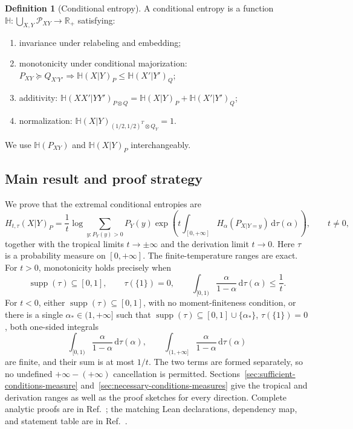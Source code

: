 \documentclass[aps,pra,11pt,onecolumn,nofootinbib,tightenlines]{revtex4-2}
\theoremstyle{definition}
\newtheorem{definition}[theorem]{Definition}
\def \d {\mathrm{d}}
\renewcommand{\H}{\mathbb{H}}
\newcommand{\R}{\mathbb{R}}
\newcommand{\mc}[1]{\mathcal{#1}}
\begin{document}
\begin{definition}[Conditional entropy]
\label{def: conditional entropy}
A conditional entropy is a function
$\H:\bigcup_{X,Y}\mc P_{XY}\to\R_+$ satisfying:
\begin{enumerate}[itemsep=1pt]
 \item invariance under relabeling and embedding;
 \label{eq:QCE-2nd-postulate-iso}
 \item monotonicity under conditional majorization:
 $P_{XY}\succeq Q_{X'Y'}\Rightarrow
 \H(X|Y)_P\leq\H(X'|Y')_Q$;
 \label{eq:QCE-1st-postulate-mono}
 \item additivity:
 $\H(XX'|YY')_{P\otimes Q}
 =\H(X|Y)_P+\H(X'|Y')_Q$;
 \label{eq:QCE-3rd-postulate-add}
 \item normalization:
 $\H(X|Y)_{(1/2,1/2)^T\otimes Q_Y}=1$.
 \label{eq:QCE-4-postulate-normalization}
\end{enumerate}
\end{definition}
We use $\H(P_{XY})$ and $\H(X|Y)_P$ interchangeably.

\subsection*{Main result and proof strategy}

We prove that the extremal conditional entropies are
\begin{equation}
 H_{t,\tau}(X|Y)_P
 =\frac1t\log\sum_{y:P_Y(y)>0}P_Y(y)
 \exp\!\left(t\int_{[0,+\infty]}
 H_\alpha(P_{X|Y=y})\,\d\tau(\alpha)\right),
 \qquad t\neq0,
 \label{eq:General}
\end{equation}
together with the tropical limits $t\to\pm\infty$ and the derivation limit
$t\to0$.  Here $\tau$ is a probability measure on $[0,+\infty]$.  The
finite-temperature ranges are exact.  For $t>0$, monotonicity holds precisely
when
\begin{equation}
 \operatorname{supp}(\tau)\subseteq[0,1],\qquad
 \tau(\{1\})=0,\qquad
 \int_{[0,1)}\frac{\alpha}{1-\alpha}\,\d\tau(\alpha)\leq\frac1t.
 \label{eq:intro-positive-range}
\end{equation}
For $t<0$, either $\operatorname{supp}(\tau)\subseteq[0,1]$, with no
moment-finiteness condition, or there is a single
$\alpha_*\in(1,+\infty]$ such that
$\operatorname{supp}(\tau)\subseteq[0,1]\cup\{\alpha_*\}$,
$\tau(\{1\})=0$, both one-sided integrals
\begin{equation}
 \int_{[0,1)}\frac{\alpha}{1-\alpha}\,\d\tau(\alpha),
 \qquad
 \int_{(1,+\infty]}\frac{\alpha}{1-\alpha}\,\d\tau(\alpha)
 \label{eq:intro-one-sided-moments}
\end{equation}
are finite, and their sum is at most $1/t$.  The two terms are formed
separately, so no undefined $+\infty-(+\infty)$ cancellation is permitted.
Sections~\ref{sec:sufficient-conditions-measure}
and~\ref{sec:necessary-conditions-measures} give the tropical and derivation ranges as
well as the proof sketches for every direction.  Complete analytic proofs are
in Ref.~\cite{rubboli2026parametersFull}; the matching Lean declarations,
dependency map, and statement table are in
Ref.~\cite{rubboli2026parametersLean}.
\end{document}
